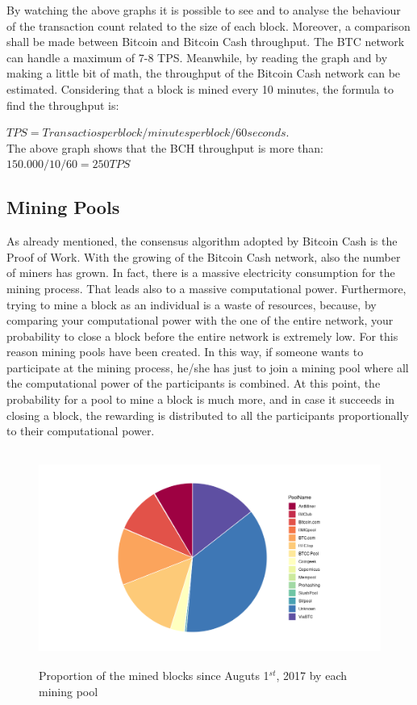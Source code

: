 By watching the above graphs it is possible to see and to analyse the behaviour of the transaction count
related to the size of each block. Moreover, a comparison shall be made between Bitcoin and Bitcoin Cash throughput.
The BTC network can handle a maximum of 7-8 TPS\cite{thecryptonomist}. Meanwhile, by reading 
the graph and by making a little bit of math, the throughput of the Bitcoin Cash network can be estimated. 
Considering that a block is mined every 10 minutes, the formula to find the throughput is: \smallskip

$TPS = Transactios per block / minutes per block / 60 seconds$. \smallskip\\
The above graph shows that the BCH throughput is more than: $150.000 / 10 / 60 = 250 TPS$

\subsection{Mining Pools}
As already mentioned, the consensus algorithm adopted by Bitcoin Cash is the Proof of Work.
With the growing of the Bitcoin Cash network, also the number of miners has grown. In fact, 
there is a massive electricity consumption for the mining process. That leads also to a 
massive computational power. Furthermore, trying to mine a block as an individual is a waste of
resources, because, by comparing your computational power with the one of the entire network, your
probability to close a block before the entire network is extremely low. For this reason 
mining pools have been created. In this way, if someone wants to participate at the mining process,
he/she has just to join a mining pool where all the computational power of the participants is combined.
At this point, the probability for a pool to mine a block is much more, and in case it succeeds in 
closing a block, the rewarding is distributed to all the participants proportionally to their computational power.\pagebreak 

\begin{figure}[h]
    \centering
    \includegraphics[height = 7cm]{poolminers.png}
    \caption{Proportion of the mined blocks since Auguts 1$^{st}$, 2017 by each mining pool}
    \label{fig:request}
\end{figure}

